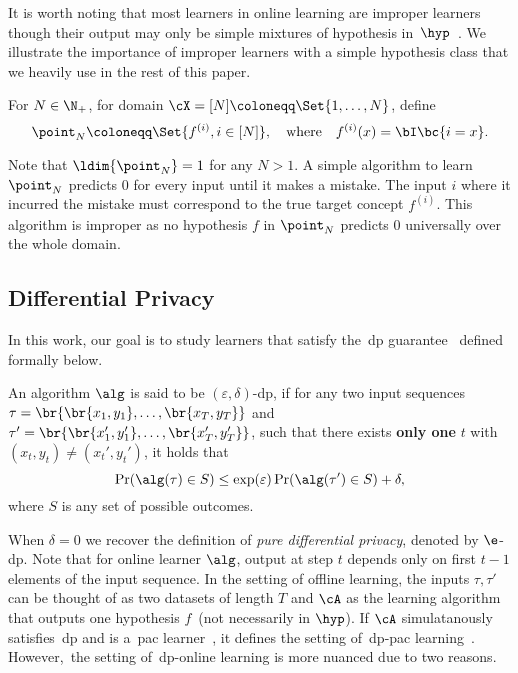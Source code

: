It is worth noting that most learners in online learning are improper learners though their output may only be simple mixtures of hypothesis in~\(\hyp\)~\citep{hanneke2021online}. We illustrate the importance of improper learners with a simple hypothesis class that we heavily use in the rest of this paper.
\begin{definition}\label{defn:point-class}
    For \(N \in \N_+\), for domain \(\cX = [N] \coloneqq \Set{1, \ldots, N}\), define
    \begin{equation}
        \point_N \coloneqq \Set{f^{(i)}, i \in [N]}, \quad \text{where} \quad f^{(i)}(x) = \bI\bc{i = x}.
    \end{equation}
\end{definition}
Note that \(\ldim{\point_N} = 1\) for any \(N > 1\). A simple algorithm to learn \(\point_N\) predicts \(0\) for every input until it makes a mistake. The input \(i\) where it incurred the mistake must correspond to the true target concept \(f^{(i)}\). This algorithm is improper as no hypothesis \(f\) in \(\point_N\) predicts \(0\) universally over the whole domain.

\subsection{Differential Privacy}
In this work, our goal is to study learners that satisfy the~\Gls{dp} guarantee~\citep{dwork2006calibrating} defined formally below.

\begin{definition}\label{defn:dp}
    An algorithm \(\alg\) is said to be \((\varepsilon, \delta)\)-\Gls{dp}, if for any two input sequences \(\tau = \br{\br{x_1, y_1}, \ldots, \br{x_T, y_T}}\) and \(\tau'= \br{\br{x_1', y_1'}, \ldots, \br{x_T', y_T'}}\), such that there exists \textbf{only one} \(t\) with \((x_t, y_t) \neq (x_t', y_t')\), it holds that 
    \begin{equation}
        \Pr(\alg(\tau) \in S) \leq \exp(\varepsilon) \Pr(\alg(\tau') \in S) + \delta,
    \end{equation}
    where \(S\) is any set of possible outcomes.
\end{definition}
When \(\delta = 0\) we recover the definition of \emph{pure differential privacy}, denoted by \(\e\)-\Gls{dp}. 
Note that for online learner \(\alg\), output at step \(t\) depends only on first \(t - 1\) elements of the input sequence. In the setting of offline learning, the inputs \(\tau,\tau'\) can be thought of as two datasets of length \(T\) and \(\cA\) as the learning algorithm that outputs one hypothesis \(f\)~(not necessarily in \(\hyp\)). If \(\cA\) simulatanously satisfies~\Gls{dp} and is a~\Gls{pac} learner~\citep{valiant1984theory}, it defines the setting of~\Gls{dp}-\Gls{pac} learning~\citep{kasiviswanathan2011can}. However,~the setting of~\Gls{dp}-online learning is more nuanced due to two reasons.\\

